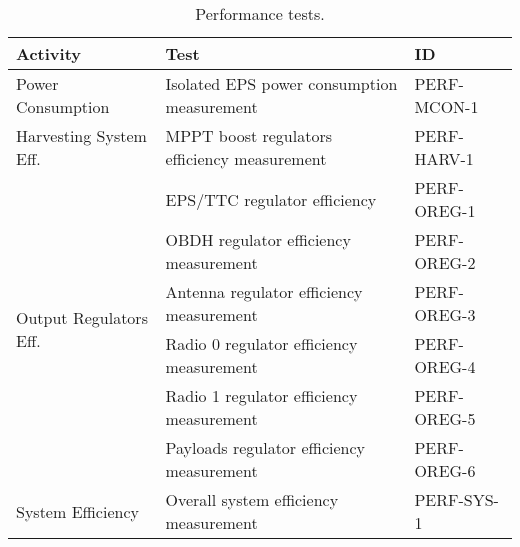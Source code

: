 \begin{table}[htp]
    \small
    \centering
    \begin{tabular}{lll}
        \toprule
        \textbf{Activity}                           & \textbf{Test}                                 & \textbf{ID}   \\
        \midrule
        \midrule
        \multirow{1}{*}{Power Consumption}          & Isolated EPS power consumption measurement    & PERF-MCON-1     \\
        \midrule
        \multirow{1}{*}{Harvesting System Eff.}     & MPPT boost regulators efficiency measurement  & PERF-HARV-1     \\
        \midrule
        \multirow{6}{*}{Output Regulators Eff.}     & EPS/TTC regulator efficiency                  & PERF-OREG-1     \\
                                                    & OBDH regulator efficiency measurement         & PERF-OREG-2     \\
                                                    & Antenna regulator efficiency measurement      & PERF-OREG-3     \\
                                                    & Radio 0 regulator efficiency measurement      & PERF-OREG-4     \\
                                                    & Radio 1 regulator efficiency measurement      & PERF-OREG-5     \\
                                                    & Payloads regulator efficiency measurement     & PERF-OREG-6     \\
        \midrule
        \multirow{1}{*}{System Efficiency}          & Overall system efficiency measurement         & PERF-SYS-1     \\
        \bottomrule
    \end{tabular}
    \caption{Performance tests.}
    \label{tab:performance-tests}
\end{table}

